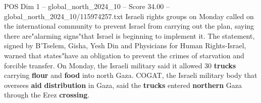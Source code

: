 \begin{textsample}{POS Dim 1 – global\_north\_2024\_10 – Score 34.00 – global\_north\_2024\_10/115974257.txt}
Israeli rights groups on Monday called on the international community to prevent Israel from carrying out the plan, saying there are"alarming signs"that Israel is beginning to implement it.
The statement, signed by B'Tselem, Gisha, Yesh Din and Physicians for Human Rights-Israel, warned that states"have an obligation to prevent the crimes of starvation and forcible transfer.
On Monday, the Israeli military said it allowed 30 \textbf{trucks} carrying \textbf{flour} and \textbf{food} into north Gaza.
COGAT, the Israeli military body that oversees \textbf{aid} \textbf{distribution} in Gaza, said the \textbf{trucks} entered \textbf{northern} Gaza through the Erez \textbf{crossing}.

\end{textsample}
